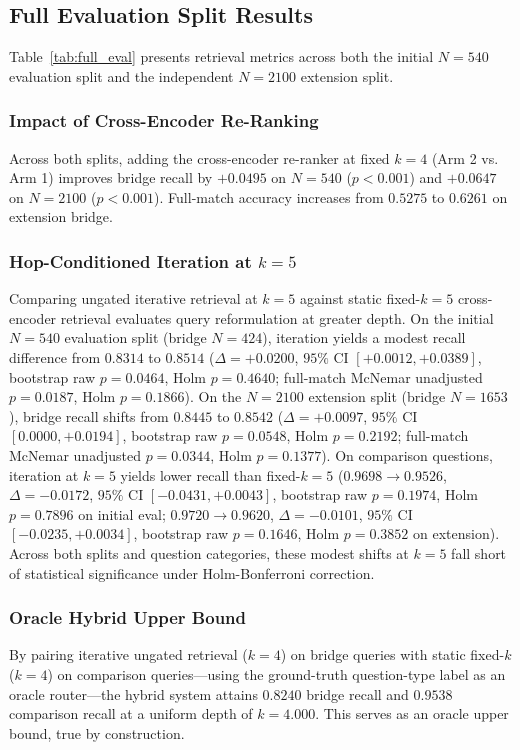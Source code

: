 \documentclass[conference]{IEEEtran}
\begin{document}
\subsection{Full Evaluation Split Results}
Table~\ref{tab:full_eval} presents retrieval metrics across both the initial $N=540$ evaluation split and the independent $N=2100$ extension split.

\subsubsection{Impact of Cross-Encoder Re-Ranking}
Across both splits, adding the cross-encoder re-ranker at fixed $k=4$ (Arm 2 vs. Arm 1) improves bridge recall by $+0.0495$ on $N=540$ ($p < 0.001$) and $+0.0647$ on $N=2100$ ($p < 0.001$). Full-match accuracy increases from $0.5275$ to $0.6261$ on extension bridge.

\subsubsection{Hop-Conditioned Iteration at $k=5$}
Comparing ungated iterative retrieval at $k=5$ against static fixed-$k=5$ cross-encoder retrieval evaluates query reformulation at greater depth. On the initial $N=540$ evaluation split (bridge $N=424$), iteration yields a modest recall difference from $0.8314$ to $0.8514$ ($\Delta = +0.0200$, $95\%$ CI $[+0.0012, +0.0389]$, bootstrap raw $p = 0.0464$, Holm $p = 0.4640$; full-match McNemar unadjusted $p = 0.0187$, Holm $p = 0.1866$). On the $N=2100$ extension split (bridge $N=1653$), bridge recall shifts from $0.8445$ to $0.8542$ ($\Delta = +0.0097$, $95\%$ CI $[0.0000, +0.0194]$, bootstrap raw $p = 0.0548$, Holm $p = 0.2192$; full-match McNemar unadjusted $p = 0.0344$, Holm $p = 0.1377$). On comparison questions, iteration at $k=5$ yields lower recall than fixed-$k=5$ ($0.9698 \to 0.9526$, $\Delta = -0.0172$, $95\%$ CI $[-0.0431, +0.0043]$, bootstrap raw $p = 0.1974$, Holm $p = 0.7896$ on initial eval; $0.9720 \to 0.9620$, $\Delta = -0.0101$, $95\%$ CI $[-0.0235, +0.0034]$, bootstrap raw $p = 0.1646$, Holm $p = 0.3852$ on extension). Across both splits and question categories, these modest shifts at $k=5$ fall short of statistical significance under Holm-Bonferroni correction.


\subsubsection{Oracle Hybrid Upper Bound}
By pairing iterative ungated retrieval ($k=4$) on bridge queries with static fixed-$k$ ($k=4$) on comparison queries—using the ground-truth question-type label as an oracle router—the hybrid system attains $0.8240$ bridge recall and $0.9538$ comparison recall at a uniform depth of $k=4.000$. This serves as an oracle upper bound, true by construction.
\end{document}
